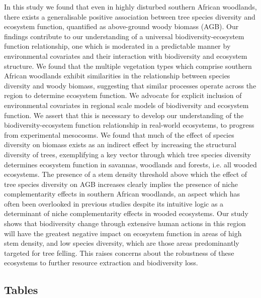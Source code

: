 \documentclass[11pt,a4paper]{article}
\begin{document}
In this study we found that even in highly disturbed southern African woodlands, there exists a generalisable positive association between tree species diversity and ecosystem function, quantified as above-ground woody biomass (AGB). 
Our findings contribute to our understanding of a universal biodiversity-ecosystem function relationship, one which is moderated in a predictable manner by environmental covariates and their interaction with biodiversity and ecosystem structure.
We found that the multiple vegetation types which comprise southern African woodlands exhibit similarities in the relationship between species diversity and woody biomass, suggesting that similar  processes operate across the region to determine ecosystem function. 
We advocate for explicit inclusion of environmental covariates in regional scale models of biodiversity and ecosystem function. We assert that this is necessary to develop our understanding of the biodiversity-ecosystem function relationship in real-world ecosystems, to progress from experimental mesocosms.
We found that much of the effect of species diversity on biomass exists as an indirect effect by increasing the structural diversity of trees, exemplifying a key vector through which tree species diversity determines ecosystem function in savannas, woodlands and forests, i.e. all wooded ecosystems.
The presence of a stem density threshold above which the effect of tree species diversity on AGB increases clearly implies the presence of niche complementarity effects in southern African woodlands, an aspect which has often been overlooked in previous studies despite its intuitive logic as a determinant of niche complementarity effects in wooded ecosystems.
Our study shows that biodiversity change through extensive human actions in this region will have the greatest negative impact on ecosystem function in areas of high stem density, and low species diversity, which are those areas predominantly targeted for tree felling. This raises concerns about the robustness of these ecosystems to further resource extraction and biodiversity loss. 

\newpage{}

\begin{landscape}
\section{Tables}

\end{landscape}


\end{document}
